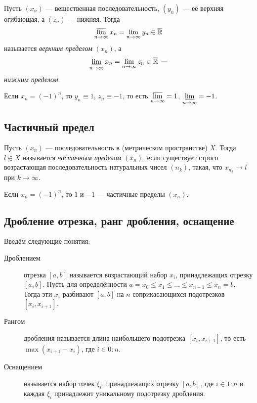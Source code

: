 \begin{ndefinition}
	Пусть \((x_n)\) --- вещественная последовательность, \((y_n)\) --- её верхняя огибающая, а \((z_n)\) --- нижняя. Тогда \[
	\varlimsup_{n \to \infty} x_n = \lim_{n \to \infty} y_n \in \overline{\mathbb{R}}
	\]
	называется \textit{верхним пределом} \((x_n)\), а \[
	\varliminf\limits_{n \to \infty} x_n = \lim\limits_{n \to \infty} z_n \in \overline{\mathbb{R}} \ \textit{---}
	\]
	\textit{нижним пределом}.
\end{ndefinition}

\begin{example}
	Если \(x_n = (-1)^n\), то \(y_n \equiv 1\), \(z_n \equiv -1\), то есть \(\varlimsup\limits_{n \to \infty} = 1\), \(\varliminf\limits_{n \to \infty} = -1\).
\end{example}

\subsection{Частичный предел}

\begin{definition}
	Пусть \((x_n)\) --- последовательность в (метрическом пространстве) \(X\). Тогда \(l \in X\) называется \textit{частичным пределом} \((x_n)\), если существует строго возрастающая последовательность натуральных чисел \((n_k)\), такая, что \(x_{n_k} \to l\) при \(k \to \infty\).
\end{definition}

\begin{example}
	Если \(x_n = (-1)^n\), то \(1\) и \(-1\) --- частичные пределы \((x_n)\).
\end{example}

\subsection{Дробление отрезка, ранг дробления, оснащение}

\begin{definition}
	Введём следующие понятия:
	\begin{description}
		\item[Дроблением] отрезка \([a, b]\) называется возрастающий набор \(x_i\), принадлежащих отрезку \([a, b]\). Пусть для определённости \linebreak \(a = x_0 \leqslant x_1 \leqslant \ldots \leqslant x_{n - 1} \leqslant x_n = b\). Тогда эти \(x_i\) разбивают \([a, b]\) на \(n\) соприкасающихся подотрезков \([x_i, x_{i + 1}]\).
		\item[Рангом] дробления называется длина наибольшего подотрезка \([x_i, x_{i + 1}]\), то есть \(\max (x_{i + 1} - x_i)\), где \(i \in 0 : n\).
		\item[Оснащением] называется набор точек \(\xi_i\), принадлежащих отрезку \([a, b]\), где \(i \in 1 : n\) и каждая \(\xi_i\) принадлежит уникальному подотрезку дробления.
	\end{description}
\end{definition}

